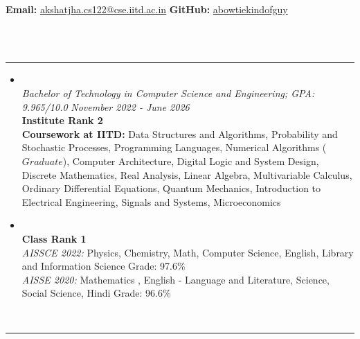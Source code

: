 \documentclass[9pt, letterpaper]{article}
\begin{document}
\noindent{\fontsize{30}{36}\selectfont{Akshat Jha}}
\\
{\hspace{1cm} \textbf{Email:} \href{mailto:akshatjha.cs122@cse.iitd.ac.in}
{akshatjha.cs122@cse.iitd.ac.in}}
\hfill
{\textbf{GitHub:} \href{https://www.github.com/abowtiekindofguy}{abowtiekindofguy}}
\\
\\
{
\fontsize{10}{12} \selectfont{EDUCATION}
\\
\hrule \relax
}
\begin{itemize}
    \item {{\fontsize{12}{14}}
    \\
    \emph{Bachelor of Technology in Computer Science and Engineering; GPA: 9.965/10.0}
    \hfill
    \emph{November 2022 - June 2026}
    \\
    \textbf{Institute Rank 2}
    \hfill
    \\
    \textbf{Coursework at IITD: }Data Structures and Algorithms, Probability and Stochastic Processes, Programming Languages, Numerical Algorithms ($Graduate$), Computer Architecture, Digital Logic and System Design, Discrete Mathematics, Real Analysis, Linear Algebra, Multivariable Calculus, Ordinary Differential Equations, Quantum Mechanics, Introduction to Electrical Engineering, Signals and Systems, Microeconomics}
    \item {{\fontsize{12}{14}}
    \\
    \textbf{Class Rank 1}
    \\
    \emph{AISSCE 2022: }Physics, Chemistry, Math, Computer Science, English, Library and Information Science \hfill Grade: 97.6\%
    \hfill
\\
    \emph{AISSE 2020: }Mathematics , English - Language and Literature, Science, Social Science, Hindi \hfill Grade: 96.6\%   
    } \\
    
\end{itemize}



{
\noindent \fontsize{10}{12} \selectfont{EXPERIENCE}
\\
\hrule \relax
}
\end{document}
